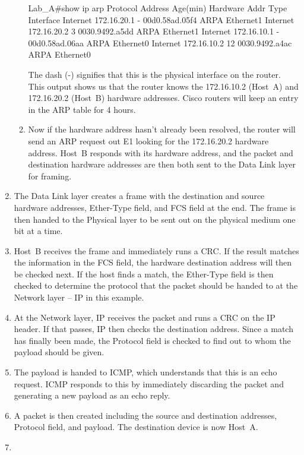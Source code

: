 \begin{enumerate}
\begin{enumerate}
\begin{cli}
Lab_A#show ip arp
Protocol  Address     Age(min) Hardware Addr  Type   Interface
Internet  172.16.20.1   -     00d0.58ad.05f4  ARPA   Ethernet1
Internet  172.16.20.2   3     0030.9492.a5dd  ARPA   Ethernet1
Internet  172.16.10.1   -     00d0.58ad.06aa  ARPA   Ethernet0
Internet  172.16.10.2  12     0030.9492.a4ac  ARPA   Ethernet0
\end{cli}

    The dash (-) signifies that this is the physical interface on the
    router. This output shows us that the router knows the 172.16.10.2
    (Host~A) and 172.16.20.2 (Host~B) hardware addresses. Cisco
    routers will keep an entry in the ARP table for 4 hours.
  \item
    Now if the hardware address hasn't already been resolved, the router
    will send an ARP request out E1 looking for the 172.16.20.2 hardware
    address. Host~B responds with its hardware address, and the packet
    and destination hardware addresses are then both sent to the Data
    Link layer for framing.
  \end{enumerate}
\item
  The Data Link layer creates a frame with the destination and source
  hardware addresses, Ether-Type field, and FCS field at the end. The
  frame is then handed to the Physical layer to be sent out on the
  physical medium one bit at a time.
\item
  Host~B receives the frame and immediately runs a CRC. If the result
  matches the information in the FCS field, the hardware destination
  address will then be checked next. If the host finds a match, the
  Ether-Type field is then checked to determine the protocol that the
  packet should be handed to at the Network layer -- IP in this example.
\item
  At the Network layer, IP receives the packet and runs a CRC on the IP
  header. If that passes, IP then checks the destination address. Since
  a match has finally been made, the Protocol field is checked to find
  out to whom the payload should be given.
\item
  The payload is handed to ICMP, which understands that this is an echo
  request. ICMP responds to this by immediately discarding the packet
  and generating a new payload as an echo reply.
\item
  A packet is then created including the source and destination
  addresses, Protocol field, and payload. The destination device is now
  Host~A.
\item

\end{enumerate}
